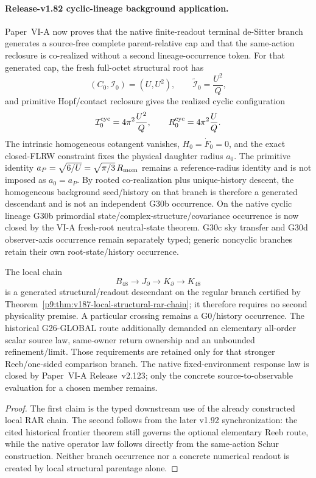 \documentclass[12pt,a4paper]{article}
\begin{document}
\paragraph{Release-v1.82 cyclic-lineage background application.}
Paper~VI-A now proves that the native finite-readout terminal de-Sitter branch
generates a source-free complete parent-relative cap and that the same-action
reclosure is co-realized without a second lineage-occurrence token.  For that
generated cap, the fresh full-octet structural root has
\[
 (C_0,\mathcal I_0)=(U,U^2),
 \qquad
 \widetilde{\mathcal I}_0=\frac{U^2}{Q},
\]
and primitive Hopf/contact reclosure gives the realized cyclic configuration
\[
 \mathcal I_0^{\rm cyc}=4\pi^2\frac{U^2}{Q},
 \qquad
 R_0^{\rm cyc}=4\pi^2\frac{U}{Q}.
\]
The intrinsic homogeneous cotangent vanishes, \(H_0=\dot F_0=0\), and the
exact closed-FLRW constraint fixes the physical daughter radius \(a_0\).  The
primitive identity \(a_P=\sqrt{6/U}=\sqrt{\pi/3}\,R_{\rm mom}\) remains a reference-radius
identity and is not imposed as \(a_0=a_P\).  By rooted co-realization plus
unique-history descent, the homogeneous background seed/history on that branch
is therefore a generated descendant and is not an independent G30b
occurrence.  On the native cyclic lineage G30b primordial
state/complex-structure/covariance occurrence is now closed by the VI-A
fresh-root neutral-state theorem.  G30c sky transfer and G30d observer-axis
occurrence remain separately typed; generic noncyclic branches retain their
own root-state/history occurrence.

\begin{corollary}
\label{p9:cor:v164-local-rar-g26-status}
The local chain
\[
 B_{48}\longrightarrow J_\partial\longrightarrow K_\partial
 \longrightarrow K_{48}
\]
is a generated structural/readout descendant on the regular branch certified
by Theorem~\ref{p9:thm:v187-local-structural-rar-chain}; it therefore requires
no second physicality premise.  A particular crossing remains a G0/history occurrence.  The historical
G26-GLOBAL route additionally demanded an elementary all-order scalar source
law, same-owner return ownership and an unbounded refinement/limit.  Those
requirements are retained only for that stronger Reeb/one-sided comparison
branch.  The native fixed-environment response law is closed by Paper~VI-A
Release~v2.123; only the concrete source-to-observable evaluation for a chosen
member remains.
\end{corollary}
\begin{proof}
The first claim is the typed downstream use of the already constructed local
RAR chain.  The second follows from the later v1.92 synchronization: the cited historical
frontier theorem still governs the optional elementary Reeb route, while the
native operator law follows directly from the same-action Schur construction.
Neither branch occurrence nor a concrete numerical readout is created by local
structural parentage alone.
\end{proof}
\end{document}

